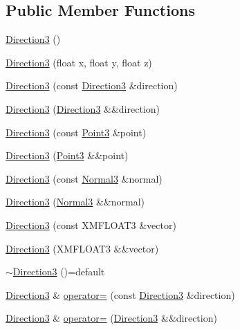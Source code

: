 \subsection*{Public Member Functions}
\begin{DoxyCompactItemize}
\item 
\hyperlink{structmage_1_1_direction3_a29603b6349c5a313d5bd93e0b0235ff1}{Direction3} ()
\item 
\hyperlink{structmage_1_1_direction3_a1b2cd4ce14856da23dfa9c5facc90da2}{Direction3} (float x, float y, float z)
\item 
\hyperlink{structmage_1_1_direction3_a8f6264f5a7a7590e67f4efa8f0687cdd}{Direction3} (const \hyperlink{structmage_1_1_direction3}{Direction3} \&direction)
\item 
\hyperlink{structmage_1_1_direction3_a0cefb5629c90c18fe48e4528415f95e9}{Direction3} (\hyperlink{structmage_1_1_direction3}{Direction3} \&\&direction)
\item 
\hyperlink{structmage_1_1_direction3_ad5680af7ed9856d3c5a2454bfec21b3b}{Direction3} (const \hyperlink{structmage_1_1_point3}{Point3} \&point)
\item 
\hyperlink{structmage_1_1_direction3_a350aca0e06f13ced11aff8fc3d1c2ed2}{Direction3} (\hyperlink{structmage_1_1_point3}{Point3} \&\&point)
\item 
\hyperlink{structmage_1_1_direction3_a18282959c79c93d25488d72f944495e3}{Direction3} (const \hyperlink{structmage_1_1_normal3}{Normal3} \&normal)
\item 
\hyperlink{structmage_1_1_direction3_a1449bce28e2956adb85f015adfbb1c0d}{Direction3} (\hyperlink{structmage_1_1_normal3}{Normal3} \&\&normal)
\item 
\hyperlink{structmage_1_1_direction3_afb66ddfb4489dd7c0bfc25c29b97df9c}{Direction3} (const X\+M\+F\+L\+O\+A\+T3 \&vector)
\item 
\hyperlink{structmage_1_1_direction3_aed574d252f60d1832e83a5f996b7dd9f}{Direction3} (X\+M\+F\+L\+O\+A\+T3 \&\&vector)
\item 
\hyperlink{structmage_1_1_direction3_a583c087dc366d206aaf54a33bc90c50b}{$\sim$\+Direction3} ()=default
\item 
\hyperlink{structmage_1_1_direction3}{Direction3} \& \hyperlink{structmage_1_1_direction3_a3b3251fcafc37b39bad2c89e5faa09bd}{operator=} (const \hyperlink{structmage_1_1_direction3}{Direction3} \&direction)
\item 
\hyperlink{structmage_1_1_direction3}{Direction3} \& \hyperlink{structmage_1_1_direction3_aaf4d2b9927d99ab3b703c1e6e61a5f36}{operator=} (\hyperlink{structmage_1_1_direction3}{Direction3} \&\&direction)
\end{DoxyCompactItemize}


